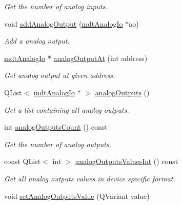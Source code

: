 \begin{DoxyCompactItemize}
\begin{DoxyCompactList}\small\item\em Get the number of analog inputs. \end{DoxyCompactList}\item 
void \hyperlink{classmdt_device_ios_aeed1140ed869866a6edc738d3b2a6d0b}{addAnalogOutput} (\hyperlink{classmdt_analog_io}{mdtAnalogIo} $\ast$ao)
\begin{DoxyCompactList}\small\item\em Add a analog output. \end{DoxyCompactList}\item 
\hyperlink{classmdt_analog_io}{mdtAnalogIo} $\ast$ \hyperlink{classmdt_device_ios_a70eba4430604bc30841ddb72664a0e98}{analogOutputAt} (int address)
\begin{DoxyCompactList}\small\item\em Get analog output at given address. \end{DoxyCompactList}\item 
\hypertarget{classmdt_device_ios_aa53fc12adeac76a039f005e72776362c}{
QList$<$ \hyperlink{classmdt_analog_io}{mdtAnalogIo} $\ast$ $>$ \hyperlink{classmdt_device_ios_aa53fc12adeac76a039f005e72776362c}{analogOutputs} ()}
\label{classmdt_device_ios_aa53fc12adeac76a039f005e72776362c}

\begin{DoxyCompactList}\small\item\em Get a list containing all analog outputs. \end{DoxyCompactList}\item 
\hypertarget{classmdt_device_ios_a8b9b14c4968e5aaae60ac7f91f77e06c}{
int \hyperlink{classmdt_device_ios_a8b9b14c4968e5aaae60ac7f91f77e06c}{analogOutputsCount} () const }
\label{classmdt_device_ios_a8b9b14c4968e5aaae60ac7f91f77e06c}

\begin{DoxyCompactList}\small\item\em Get the number of analog outputs. \end{DoxyCompactList}\item 
\hypertarget{classmdt_device_ios_acdfa626fdd73783702d4e8a750b9cf84}{
const QList$<$ int $>$ \hyperlink{classmdt_device_ios_acdfa626fdd73783702d4e8a750b9cf84}{analogOutputsValuesInt} () const }
\label{classmdt_device_ios_acdfa626fdd73783702d4e8a750b9cf84}

\begin{DoxyCompactList}\small\item\em Get all analog outputs values in device specific format. \end{DoxyCompactList}\item 
\hypertarget{classmdt_device_ios_a6f96d87047d0b02a043a60a4fd6d18a2}{
void \hyperlink{classmdt_device_ios_a6f96d87047d0b02a043a60a4fd6d18a2}{setAnalogOutputsValue} (QVariant value)}
\label{classmdt_device_ios_a6f96d87047d0b02a043a60a4fd6d18a2}


\end{DoxyCompactItemize}

